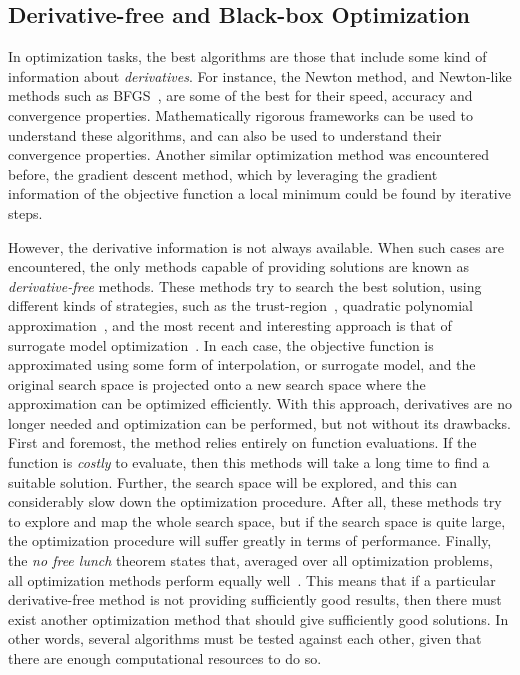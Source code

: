 \subsection{Derivative-free and Black-box Optimization}
In optimization tasks, the best algorithms are those that include some kind of information 
about \emph{derivatives}. For instance, the Newton method, and Newton-like methods such as 
BFGS~\cite{nocedalNumericalOptimization2006}, are some of the best for their speed, 
accuracy and convergence properties. Mathematically rigorous frameworks can be used to 
understand these algorithms, and can also be used to understand their convergence 
properties. Another similar optimization method was encountered before, the gradient 
descent method, which by leveraging the gradient information of the objective function a 
local minimum could be found by iterative steps.

However, the derivative information is not always available. When such cases are 
encountered, the only methods capable of providing solutions are known as 
\emph{derivative-free} methods. These methods try to search the best solution, using 
different kinds of strategies, such as the 
trust-region~\cite{byrdTrustRegionAlgorithm1987}, quadratic polynomial 
approximation~\cite{powellUOBYQAUnconstrainedOptimization2002}, and the most recent and 
interesting approach is that of surrogate model 
optimization~\cite{forresterRecentAdvancesSurrogatebased2009}. In each case, the objective 
function is approximated using some form of interpolation, or surrogate model, and the 
original search space is projected onto a new search space where the approximation can be 
optimized efficiently. With this approach, derivatives are no longer needed and 
optimization can be performed, but not without its drawbacks. First and foremost, the 
method relies entirely on function evaluations. If the function is \emph{costly} to 
evaluate, then this methods will take a long time to find a suitable solution. Further, the 
search space will be explored, and this can considerably slow down the optimization 
procedure. After all, these methods try to explore and map the whole search space, but if 
the search space is quite large, the optimization procedure will suffer greatly in terms of 
performance. Finally, the \emph{no free lunch} theorem states that, averaged over all 
optimization problems, all optimization methods perform equally 
well~\cite{adamNoFreeLunch2019}. This means that if a particular derivative-free method is 
not providing sufficiently good results, then there must exist another optimization method 
that should give sufficiently good solutions. In other words, several algorithms must be 
tested against each other, given that there are enough computational resources to do so.

